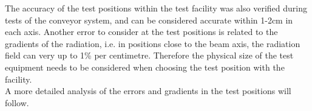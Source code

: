 The accuracy of the test positions within the test facility was also verified during tests of the conveyor system, and can be considered accurate within 1-2cm in each axis. Another error to consider at the test positions is related to the gradients of the radiation, i.e. in positions close to the beam axis, the radiation field can very up to 1\% per centimetre. Therefore the physical size of the test equipment needs to be considered when choosing the test position with the facility. \\

A more detailed analysis of the errors and gradients in the test positions will follow. \\